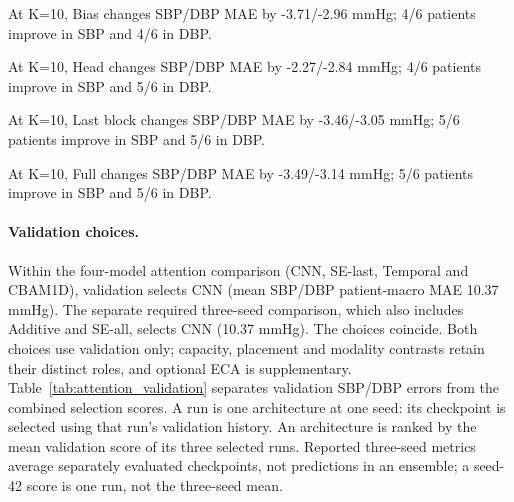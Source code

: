 \documentclass[11pt]{article}
\begin{document}
At K=10, Bias changes SBP/DBP MAE by -3.71/-2.96 mmHg; 4/6 patients improve in SBP and 4/6 in DBP.

At K=10, Head changes SBP/DBP MAE by -2.27/-2.84 mmHg; 4/6 patients improve in SBP and 5/6 in DBP.

At K=10, Last block changes SBP/DBP MAE by -3.46/-3.05 mmHg; 5/6 patients improve in SBP and 5/6 in DBP.

At K=10, Full changes SBP/DBP MAE by -3.49/-3.14 mmHg; 5/6 patients improve in SBP and 5/6 in DBP.



\paragraph{Validation choices.}

Within the four-model attention comparison (CNN, SE-last, Temporal and CBAM1D), validation selects CNN (mean SBP/DBP patient-macro MAE 10.37 mmHg). The separate required three-seed comparison, which also includes Additive and SE-all, selects CNN (10.37 mmHg). The choices coincide. Both choices use validation only; capacity, placement and modality contrasts retain their distinct roles, and optional ECA is supplementary. Table~\ref{tab:attention_validation} separates validation SBP/DBP errors from the combined selection scores. A run is one architecture at one seed: its checkpoint is selected using that run's validation history. An architecture is ranked by the mean validation score of its three selected runs. Reported three-seed metrics average separately evaluated checkpoints, not predictions in an ensemble; a seed-42 score is one run, not the three-seed mean.
\end{document}
